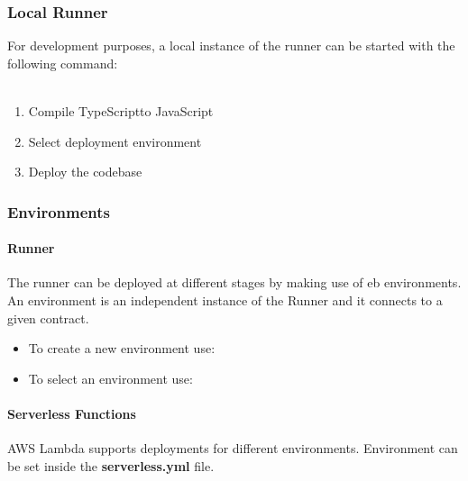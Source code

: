 \subsubsection{Local Runner}
For development purposes, a local instance of the runner can be started with the following command:\\\\\centerline{}
\begin{enumerate}
	\item Compile TypeScript\glo to JavaScript\glo \\ \centerline{}
	\item Select deployment environment \\ \centerline{}
	\item Deploy the codebase \\ \centerline{}
\end{enumerate}
\subsubsection{Environments}
\paragraph{Runner}
The runner can be deployed at different stages by making use of eb environments. An environment is an independent instance of the Runner and it connects to a given contract.
\begin{itemize}
	\item To create a new environment use:\\ \centerline{}
	\item To select an environment use:\\ \centerline{}
\end{itemize}
\paragraph{Serverless Functions}
AWS Lambda supports deployments for different environments. Environment can be set inside the \textbf{serverless.yml} file.